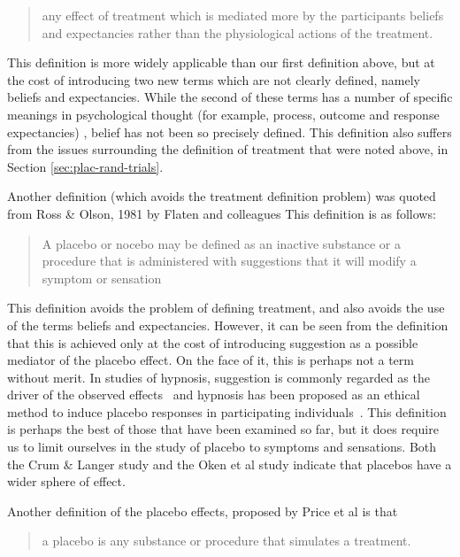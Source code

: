\begin{quotation}
  any effect of treatment which is mediated more by the participants
  beliefs and expectancies rather than the physiological actions of
  the treatment.
\end{quotation}

This definition is more widely applicable than our first definition above, but at the cost of introducing two new terms which are not clearly defined, namely beliefs and expectancies. While the second of these terms has a number of specific meanings in psychological thought (for example, process, outcome and response expectancies) \cite{Bandura1977,Kirsch1985}, belief has not been so precisely defined. This definition also suffers from the issues surrounding the definition of treatment that were noted above, in Section \ref{sec:plac-rand-trials}. 



Another definition (which avoids the treatment definition problem) was quoted from Ross \& Olson, 1981 by Flaten and colleagues \cite{Flaten1999}
This definition is as follows:

\begin{quotation}
  A placebo or nocebo may be defined as an inactive
substance or a procedure that is administered with
suggestions that it will modify a symptom or sensation
\end{quotation}

This definition avoids the problem of defining treatment, and also avoids the use of the terms beliefs and expectancies. However, it can be seen from the definition that this is achieved only at the cost of introducing suggestion as a possible mediator of the placebo effect. On the face of it, this is perhaps not a term without merit. In studies of hypnosis, suggestion is commonly regarded as the driver of the observed effects~\cite{Kirsch1994} and hypnosis has been proposed as an ethical method to induce placebo responses in participating individuals~\cite{Raz2007a}. This definition is perhaps the best of those that have been examined so far, but it does require us to limit ourselves in the study of placebo to symptoms and sensations. Both the Crum \& Langer study and the Oken et al study indicate that placebos have a wider sphere of effect. 


Another definition of the placebo effects,  proposed by Price et al \cite{Price2008} is that

\begin{quotation}
  a placebo is any substance or procedure that simulates a treatment.
\end{quotation}

